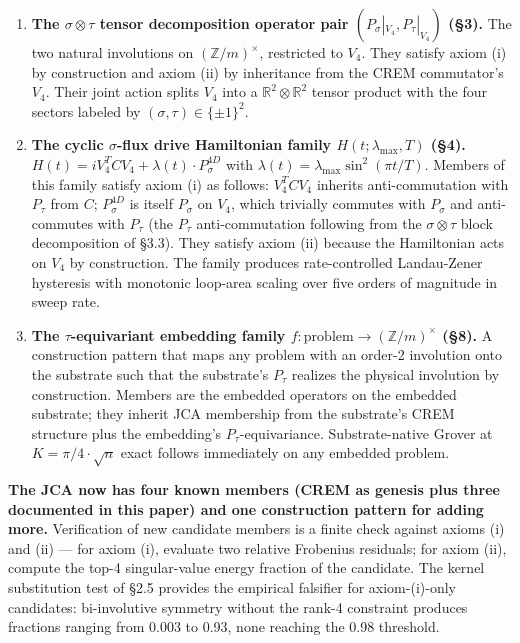 \documentclass[
]{article}
\newcounter{none} %
\begin{document}
\begin{enumerate}
\def\labelenumi{\arabic{enumi}.}
\item
  \textbf{The \(\sigma\otimes\tau\) tensor decomposition operator pair
  \((P_\sigma|_{V_4}, P_\tau|_{V_4})\) (§3).} The two natural
  involutions on \((\mathbb{Z}/m)^\times\), restricted to \(V_4\). They
  satisfy axiom (i) by construction and axiom (ii) by inheritance from
  the CREM commutator's \(V_4\). Their joint action splits \(V_4\) into
  a \(\mathbb{R}^2 \otimes \mathbb{R}^2\) tensor product with the four
  sectors labeled by \((\sigma, \tau) \in \{\pm 1\}^2\).
\item
  \textbf{The cyclic \(\sigma\)-flux drive Hamiltonian family
  \(H(t; \lambda_\text{max}, T)\) (§4).}
  \(H(t) = i V_4^T C V_4 + \lambda(t) \cdot P_\sigma^{4D}\) with
  \(\lambda(t) = \lambda_\text{max} \sin^2(\pi t / T)\). Members of this
  family satisfy axiom (i) as follows: \(V_4^T C V_4\) inherits
  anti-commutation with \(P_\tau\) from \(C\); \(P_\sigma^{4D}\) is
  itself \(P_\sigma\) on \(V_4\), which trivially commutes with
  \(P_\sigma\) and anti-commutes with \(P_\tau\) (the \(P_\tau\)
  anti-commutation following from the \(\sigma\otimes\tau\) block
  decomposition of §3.3). They satisfy axiom (ii) because the
  Hamiltonian acts on \(V_4\) by construction. The family produces
  rate-controlled Landau-Zener hysteresis with monotonic loop-area
  scaling over five orders of magnitude in sweep rate.
\item
  \textbf{The \(\tau\)-equivariant embedding family
  \(f: \text{problem} \to (\mathbb{Z}/m)^\times\) (§8).} A construction
  pattern that maps any problem with an order-2 involution onto the
  substrate such that the substrate's \(P_\tau\) realizes the physical
  involution by construction. Members are the embedded operators on the
  embedded substrate; they inherit JCA membership from the substrate's
  CREM structure plus the embedding's \(P_\tau\)-equivariance.
  Substrate-native Grover at \(K = \pi/4 \cdot \sqrt{n}\) exact follows
  immediately on any embedded problem.
\end{enumerate}

\textbf{The JCA now has four known members (CREM as genesis plus three
documented in this paper) and one construction pattern for adding more.}
Verification of new candidate members is a finite check against axioms
(i) and (ii) --- for axiom (i), evaluate two relative Frobenius
residuals; for axiom (ii), compute the top-4 singular-value energy
fraction of the candidate. The kernel substitution test of §2.5 provides
the empirical falsifier for axiom-(i)-only candidates: bi-involutive
symmetry without the rank-4 constraint produces fractions ranging from
0.003 to 0.93, none reaching the 0.98 threshold.
\end{document}
